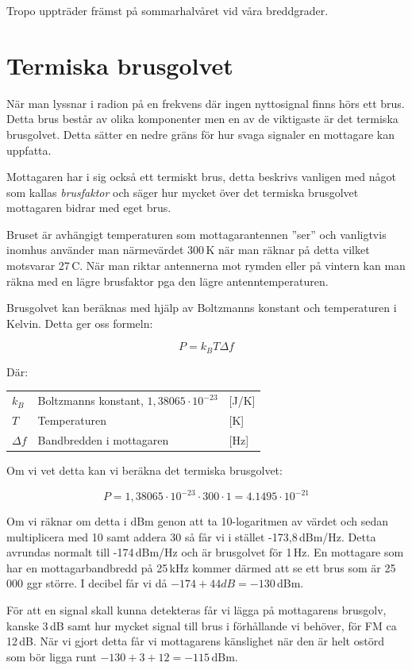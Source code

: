 Tropo uppträder främst på sommarhalvåret vid våra breddgrader.

\section{Termiska brusgolvet}
När man lyssnar i radion på en frekvens där ingen nyttosignal finns hörs ett
brus. Detta brus består av olika komponenter men en av de viktigaste är det
termiska brusgolvet. Detta sätter en nedre gräns för hur svaga signaler en
mottagare kan uppfatta.

Mottagaren har i sig också ett termiskt brus, detta beskrivs vanligen med
något som kallas \textit{brusfaktor} och säger hur mycket över det termiska
brusgolvet mottagaren bidrar med eget brus.

Bruset är avhängigt temperaturen som mottagarantennen ''ser'' och vanligtvis
inomhus använder man närmevärdet 300\,K när man räknar på detta vilket
motsvarar 27\,\textdegree C. När man riktar antennerna mot rymden eller på
vintern kan man räkna med en lägre brusfaktor pga den lägre
antenntemperaturen.

Brusgolvet kan beräknas med hjälp av Boltzmanns konstant och temperaturen i
Kelvin. Detta ger oss formeln:

\begin{equation}
	P=k_BT\Delta f
\end{equation}

Där:

\begin{tabular}{lll}
	$k_B$      & Boltzmanns konstant, $1,38065\cdot 10^{-23}$ & [J/K] \\
	$T$        & Temperaturen                                 & [K]   \\
	$\Delta f$ & Bandbredden i mottagaren                     & [Hz]
\end{tabular}

Om vi vet detta kan vi beräkna det termiska brusgolvet:

$$P = 1,38065\cdot 10^{-23} \cdot 300 \cdot 1 = 4.1495\cdot 10^{-21}$$

Om vi räknar om detta i dBm genon att ta 10-logaritmen av värdet och sedan
multiplicera med 10 samt addera 30 så får vi i stället -173,8\,dBm/Hz. Detta
avrundas normalt till -174\,dBm/Hz och är brusgolvet för 1\,Hz. En mottagare som
har en mottagarbandbredd på 25\,kHz kommer därmed att se ett brus som är
25\,000 ggr större. I decibel får vi då $-174 + 44 dB = -130$\,dBm.

För att en signal skall kunna detekteras får vi lägga på mottagarens brusgolv,
kanske 3\,dB samt hur mycket signal till brus i förhållande vi behöver, för FM
ca 12\,dB. När vi gjort detta får vi mottagarens känslighet när den är helt
ostörd som bör ligga runt $-130 + 3 + 12 = -115$\,dBm.

